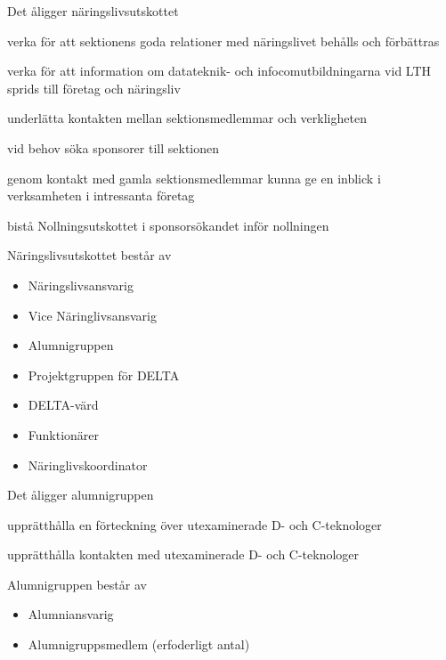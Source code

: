 \documentclass[pdfbookmarks,a4paper,11pt]{article}
\newlength{\itemcollength}
\newenvironment{reglemlista}{%
  \begin{list}{}{%
      \setlength{\labelwidth}{\itemcollength}%
      \setlength{\leftmargin}{\labelwidth + \labelsep}%
      \renewcommand{\makelabel}[1]{%
        \raisebox{0pt}[1ex][0pt]{%
          \makebox[\labelwidth][l]{%
            \parbox[t]{\itemcollength}{%
              \raggedright\hspace{0pt}##1}}}\hfill}%
      }}{%
  \end{list}}
\begin{document}
\begin{reglemlista}

	\item[Åligganden]
	Det åligger näringslivsutskottet
	\begin{attlista}
		\item verka för att sektionens goda relationer med näringslivet behålls och förbättras
		\item verka för att information om datateknik- och infocomutbildningarna vid LTH sprids till företag och näringsliv
		\item underlätta kontakten mellan sektionsmedlemmar och verkligheten
		\item vid behov söka sponsorer till sektionen
		\item genom kontakt med gamla sektionsmedlemmar kunna ge en inblick i verksamheten i intressanta företag
		\item bistå Nollningsutskottet i sponsorsökandet inför nollningen
	\end{attlista}

	\item[Sammansättning]
	Näringslivsutskottet består av
	\begin{itemize}
		\item Näringslivsansvarig
		\item Vice Näringlivsansvarig
		\item Alumnigruppen
		\item Projektgruppen för DELTA
		\item DELTA-värd
		\item Funktionärer
        \item Näringlivskoordinator
	\end{itemize}

	\item[\textbf{Alumnigruppen}]

	\item[Åligganden]
	Det åligger alumnigruppen
	\begin{attlista}
		\item  upprätthålla en förteckning över utexaminerade D- och C-teknologer
		\item upprätthålla kontakten med utexaminerade D- och C-teknologer
	\end{attlista}

	\item[Sammansättning]
	Alumnigruppen består av
	\begin{itemize}
		\item Alumniansvarig
		\item Alumnigruppsmedlem (erfoderligt antal)
	\end{itemize}

\end{reglemlista}
\end{document}
